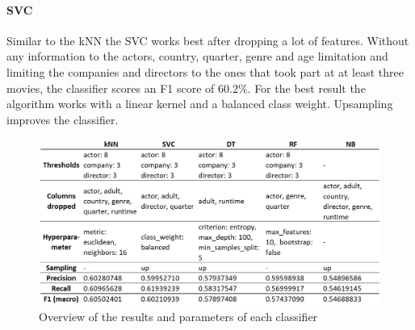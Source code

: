 \paragraph{SVC}
Similar to the kNN the SVC works best after dropping a lot of features. Without any information to the actors, country, quarter, genre and age limitation and limiting the companies and directors to the ones that took part at at least three movies, the classifier scores an F1 score of 60.2\%. For the best result the algorithm works with a linear kernel and a balanced class weight. Upsampling improves the classifier.
\begin{figure}[h]
\includegraphics[width=\textwidth]{images/Classifier.png}
	\caption[Overview of the results and parameters of each classifier]{Overview of the results and parameters of each classifier\footnotemark}
\label{img:classifiers}
\end{figure}
\FloatBarrier
{}

